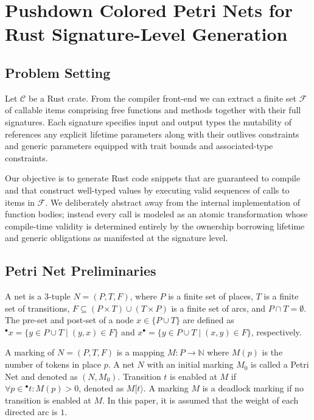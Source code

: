 \documentclass[runningheads]{llncs}
\begin{document}
\section{Pushdown Colored Petri Nets for Rust Signature-Level Generation}
\label{sec:method}

\subsection{Problem Setting}
\label{sec:method:setting}
Let $\mathcal{C}$ be a Rust crate. From the compiler front-end we can extract a finite set $\mathcal{F}$ of callable items comprising free functions and methods together with their full signatures. Each signature specifies input and output types the mutability of references any explicit lifetime parameters along with their outlives constraints and generic parameters equipped with trait bounds and associated-type constraints.

Our objective is to generate Rust code snippets that are guaranteed to compile and that construct well-typed values by executing valid sequences of calls to items in $\mathcal{F}$. We deliberately abstract away from the internal implementation of function bodies; instead every call is modeled as an atomic transformation whose compile-time validity is determined entirely by the ownership borrowing lifetime and generic obligations as manifested at the signature level.

\subsection{Petri Net Preliminaries}
\label{sec:method:pn}
\begin{definition}
\label{def:pn}
A net is a $3$-tuple $N=(P,T,F)$, where $P$ is a finite set of places, $T$ is a finite set of transitions,
$F\subseteq (P\times T) \cup (T\times P)$ is a finite set of arcs, and $P\cap T=\emptyset$.
The pre-set and post-set of a node $x \in\{P \cup T\}$ are defined as
$^{\bullet}x=\{y\in P\cup T\mid (y,x)\in F\}$ and $x^{\bullet}=\{y\in P\cup T\mid (x,y)\in F\}$, respectively. 
\end{definition}
 A marking of $N=(P,T,F)$ is a mapping $M:P\rightarrow \mathbb{N}$ where $M(p)$ is the number of tokens in place $p$. A net $N$ with an initial marking $M_{0}$ is called a Petri Net and denoted as $(N,M_{0})$. Transition $t$ is enabled at $M$ if $\forall p\in {}^{\bullet}t: M(p)>0$, denoted as $M[t\rangle$. A marking $M$ is a deadlock marking if no transition is enabled at $M$. In this paper, it is assumed that the weight of each directed arc is $1$.
\end{document}
